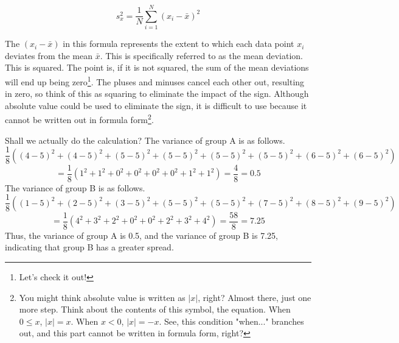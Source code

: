 \documentclass{ltjbook}
\begin{document}
\[ s_x^2  = \frac{1}{N}\sum_{i=1}^N (x_i - \bar{x})^2 \]

The $(x_i - \bar{x})$ in this formula represents the extent to which each data point $x_i$ deviates from the mean $\bar{x}$. This is specifically referred to as the mean deviation. This is squared. The point is, if it is not squared, the sum of the mean deviations will end up being zero\footnote{Let's check it out!}. The pluses and minuses cancel each other out, resulting in zero, so think of this as squaring to eliminate the impact of the sign. Although absolute value could be used to eliminate the sign, it is difficult to use because it cannot be written out in formula form\footnote{You might think absolute value is written as $|x|$, right? Almost there, just one more step. Think about the contents of this symbol, the equation. When $0\le x$, $|x|=x$. When $x<0$, $|x|=-x$. See, this condition "when..." branches out, and this part cannot be written in formula form, right?}.

Shall we actually do the calculation? The variance of group A is as follows.
\[ \frac{1}{8}((4-5)^2+(4-5)^2+(5-5)^2+(5-5)^2+(5-5)^2+(5-5)^2+(6-5)^2+(6-5)^2) \]
\[ =\frac{1}{8}(1^2+1^2+0^2+0^2+0^2+0^2+1^2+1^2) = \frac{4}{8}=0.5\]
The variance of group B is as follows.
\[ \frac{1}{8}((1-5)^2+(2-5)^2+(3-5)^2+(5-5)^2+(5-5)^2+(7-5)^2+(8-5)^2+(9-5)^2)\]
\[ =\frac{1}{8}(4^2+3^2+2^2+0^2+0^2+2^2+3^2+4^2) = \frac{58}{8}=7.25 \]
Thus, the variance of group A is 0.5, and the variance of group B is 7.25, indicating that group B has a greater spread.
\end{document}
